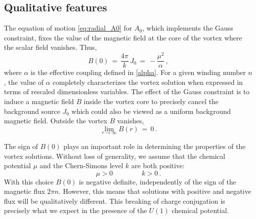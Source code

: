 \documentclass[12pt,a4paper]{article}
\def\be{\begin{equation}}
\def\ee{\end{equation}}
\begin{document}
\subsection{Qualitative features}
The equation of motion \eqref{eq:radial_A0} for $A_0$, which implements the Gauss constraint, fixes the value of the magnetic field at the core of the vortex where the scalar field vanishes. Thus,
\be
B(0)\,=\,\frac{4\pi}{k}\,J_0
\,=\,-\frac{\mu^2}{\alpha}\,,
\ee
where $\alpha$ is the effective coupling defined in \eqref{alpha}. For a given winding number $n$, the value of $\alpha$ completely characterizes the vortex solution when expressed in terms of rescaled dimensionless variables.
The effect of the Gauss constraint is to induce a magnetic field $B$ inside the vortex core to precisely cancel the background source $J_0$ which could also  be viewed as a uniform background magnetic field.  Outside the vortex $B$ vanishes,
\be
\lim_{r\to\infty} B(r)\,=\,0\,.
\ee

The sign of $B(0)$ plays an important role in determining the properties of the vortex solutions. Without loss of generality, we assume that the chemical potential $\mu$ and the Chern-Simons level $k$ are both positive:
\be
\mu >0\, \qquad \qquad k >0\,.
\ee
With this choice $B(0)$ is negative definite,   independently of the sign of the magnetic flux $2\pi n$. However, this means that solutions with positive and negative flux will be qualitatively different. This breaking of charge conjugation is precisely what we expect in the presence of the $U(1)$ chemical potential.
\end{document}
